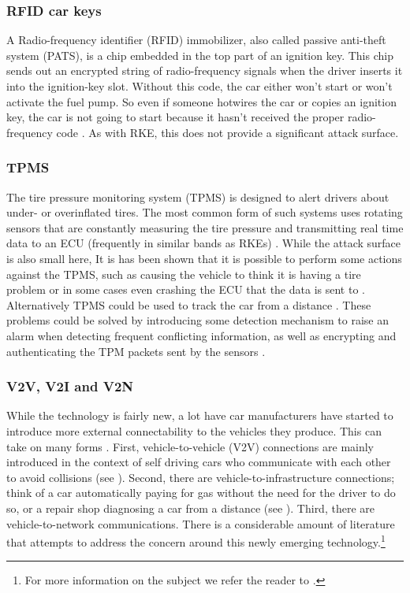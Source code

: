 \subsubsection{RFID car keys}
\label{subsubsec:rfid} 

A Radio-frequency identifier (RFID) immobilizer, also called passive anti-theft system (PATS), is a chip embedded in the top part of an ignition key. This chip sends out an encrypted string of radio-frequency signals when the driver inserts it into the ignition-key slot. Without this code, the car either won't start or won't activate the fuel pump. So even if someone hotwires the car or copies an ignition key, the car is not going to start because it hasn't received the proper radio-frequency code \cite{RFID}. As with RKE, this does not provide a significant attack surface. \cite{MillerA}

\subsubsection{TPMS} 
\label{subsubsec:tpms}

The tire pressure monitoring system (TPMS) is designed to alert drivers about under- or overinflated tires. The most common form of such systems uses rotating sensors that are constantly measuring the tire pressure and transmitting real time data to an ECU (frequently in similar bands as RKEs) \cite{Kosher}. While the attack surface is also small here, It is has been shown that it is possible to perform some actions against the TPMS, such as causing the vehicle to think it is having a tire problem \cite{TPMS} or in some cases even crashing the ECU that the data is sent to \cite{MillerA}. Alternatively TPMS could be used to track the car from a distance \cite{TPMS}. These problems could be solved by introducing some detection mechanism to raise an alarm when detecting frequent conflicting information, as well as encrypting and authenticating the TPM packets sent by the sensors \cite{TPMS}.

\subsubsection{V2V, V2I and V2N} 
\label{subsubsec:v2v}

While the technology is fairly new, a lot have car manufacturers have started to introduce more external connectability to the vehicles they produce. This can take on many forms \cite{Ahmed}. First, vehicle-to-vehicle (V2V) connections are mainly introduced in the context of self driving cars who communicate with each other to avoid collisions (see \cite{Enisa}). Second, there are vehicle-to-infrastructure connections; think of a car automatically paying for gas without the need for the driver to do so, or a repair shop diagnosing a car from a distance (see \cite{Kleberger}). Third, there are vehicle-to-network communications. There is a considerable amount of literature that attempts to address the concern around this newly emerging technology.\footnote{For more information on the subject we refer the reader to \cite{Kleberger15, Russel17, Maxim, Crispo}.}

